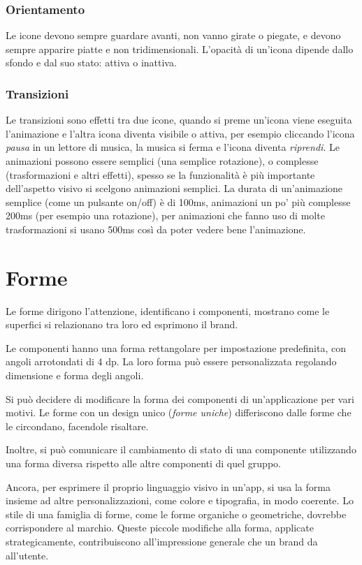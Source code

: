 \documentclass[12pt, a4paper]{report}
\begin{document}
			\subsubsection{Orientamento}
			Le icone devono sempre guardare avanti, non vanno girate o piegate, e devono sempre apparire piatte e non tridimensionali.
			L'opacità di un'icona dipende dallo sfondo e dal suo stato: attiva o inattiva.
			
			\subsubsection{Transizioni}
				Le transizioni sono effetti tra due icone, quando si preme un'icona viene eseguita l'animazione e l'altra icona diventa visibile o attiva, per esempio cliccando l'icona \textit{pausa} in un lettore di musica, la musica si ferma e l'icona diventa \textit{riprendi}.
				Le animazioni possono essere semplici (una semplice rotazione), o complesse (trasformazioni e altri effetti), spesso se la funzionalità è più importante dell'aspetto visivo si scelgono animazioni semplici.
				La durata di un'animazione semplice (come un pulsante on/off) è di 100ms, animazioni un po' più complesse 200ms (per esempio una rotazione), per animazioni che fanno uso di molte trasformazioni si usano 500ms così da poter vedere bene l'animazione.
				

	\section{Forme}
	Le forme dirigono l'attenzione, identificano i componenti, mostrano come le superfici si relazionano tra loro ed esprimono il brand.

	Le componenti hanno una forma rettangolare per impostazione predefinita, con angoli arrotondati di 4 dp. La loro forma può essere personalizzata regolando dimensione e forma degli angoli.

	Si può decidere di modificare la forma dei componenti di un’applicazione per vari motivi. Le forme con un design unico (\textit{forme uniche}) differiscono dalle forme che le circondano, facendole risaltare.

	Inoltre, si può comunicare il cambiamento di stato di una componente utilizzando una forma diversa rispetto alle altre componenti di quel gruppo.

	Ancora, per esprimere il proprio linguaggio visivo in un'app, si usa la forma insieme ad altre personalizzazioni, come colore e tipografia, in modo coerente. Lo stile di una famiglia di forme, come le forme organiche o geometriche, dovrebbe corrispondere
	al marchio. Queste piccole modifiche alla forma, applicate strategicamente, contribuiscono all'impressione generale che un brand da all’utente.
	
\end{document}
